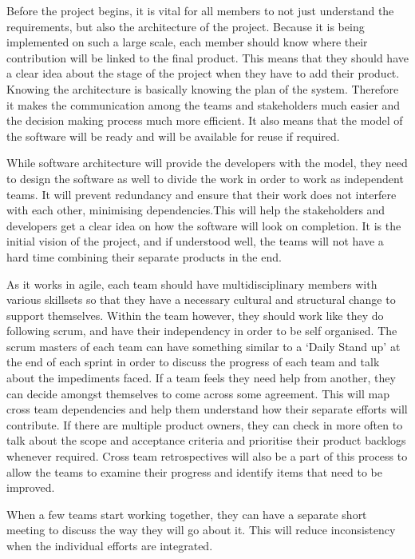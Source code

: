 \documentclass[sigconf]{acmart}
\begin{document}
Before the project begins, it is vital for all members to not just understand the requirements, but also the architecture of the project. Because it is being implemented on such a large scale, each member should know where their contribution will be linked to the final product. This means that they should have a clear idea about the stage of the project when they have to add their product. Knowing the architecture is basically knowing the plan of the system. Therefore it makes the communication among the teams and stakeholders much easier and the decision making process much more efficient. It also means that the model of the software will be ready and will be available for reuse if required. 

While software architecture will provide the developers with the model, they need to design the software as well to divide the work in order to work as independent teams. It will prevent redundancy and ensure that their work does not interfere with each other, minimising dependencies.This will help the stakeholders and developers get a clear idea on how the software will look on completion. It is the initial vision of the project, and if understood well, the teams will not have a hard time combining their separate products in the end.

As it works in agile, each team should have multidisciplinary members with various skillsets so that they have a necessary cultural and structural change to support themselves. Within the team however, they should work like they do following scrum, and have their independency in order to be self organised. The scrum masters of each team can have something similar to a ‘Daily Stand up’ at the end of each sprint in order to discuss the progress of each team and talk about the impediments faced. If a team feels they need help from another, they can decide amongst themselves to come across some agreement. This will map cross team dependencies and help them understand how their separate efforts will contribute. If there are multiple product owners, they can check in more often to talk about the scope and acceptance criteria and prioritise their product backlogs whenever required. Cross team retrospectives will also be a part of this process to allow the teams to examine their progress and identify items that need to be improved.  

When a few teams start working together, they can have a separate short meeting to discuss the way they will go about it. This will reduce inconsistency when the individual efforts are integrated. 
\end{document}
